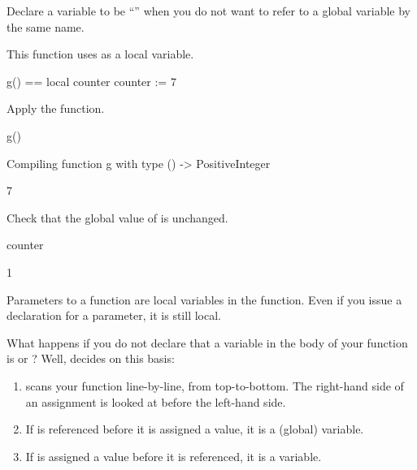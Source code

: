 Declare a variable to be ``'' when you do not want to refer to
a global variable by the same name.

\begin{xtc}
\begin{xtccomment}
This function uses  as a local variable.
\end{xtccomment}
\begin{spadsrc}
g() ==
  local counter
  counter := 7
\end{spadsrc}
\end{xtc}
\begin{xtc}
\begin{xtccomment}
Apply the function.
\end{xtccomment}
\begin{spadsrc}
g() 
\end{spadsrc}
\begin{MessageOutput}
   Compiling function g with type () -> PositiveInteger 
\end{MessageOutput}
\begin{TeXOutput}
\begin{fricasmath}{6}
7%
\end{fricasmath}
\end{TeXOutput}
\end{xtc}
\begin{xtc}
\begin{xtccomment}
Check that the global value of  is unchanged.
\end{xtccomment}
\begin{spadsrc}
counter
\end{spadsrc}
\begin{TeXOutput}
\begin{fricasmath}{7}
1%
\end{fricasmath}
\end{TeXOutput}
\end{xtc}

Parameters to a function are local variables in the function.
Even if you issue a  declaration for a parameter, it is
still local.

What happens if you do not declare that a variable  in
the body of your function is  or ?
Well, \Language{} decides on this basis:

\begin{enumerate}
\item \Language{} scans your function line-by-line, from top-to-bottom.
The right-hand side of an assignment is looked at before the left-hand
side.
\item If  is referenced before it is assigned a value, it is a
 (global) variable.
\item If  is assigned a value before it is referenced, it is a
 variable.
\end{enumerate}

